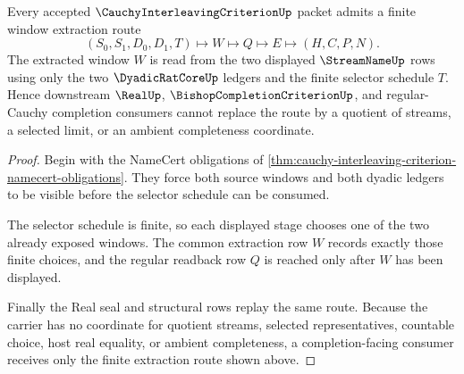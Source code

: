 \begin{theorem}
\label{thm:cauchy-interleaving-criterion-window-extraction}
Every accepted $\CauchyInterleavingCriterionUp$ packet admits a finite window extraction route
$$
(S_0,S_1,D_0,D_1,T)\longmapsto W\longmapsto Q\longmapsto E\longmapsto(H,C,P,N).
$$
The extracted window $W$ is read from the two displayed $\StreamNameUp$ rows using only the two $\DyadicRatCoreUp$ ledgers and the finite selector schedule $T$. Hence downstream $\RealUp$, $\BishopCompletionCriterionUp$, and regular-Cauchy completion consumers cannot replace the route by a quotient of streams, a selected limit, or an ambient completeness coordinate.
\end{theorem}
\begin{proof}
Begin with the NameCert obligations of \autoref{thm:cauchy-interleaving-criterion-namecert-obligations}. They force both source windows and both dyadic ledgers to be visible before the selector schedule can be consumed.

The selector schedule is finite, so each displayed stage chooses one of the two already exposed windows. The common extraction row $W$ records exactly those finite choices, and the regular readback row $Q$ is reached only after $W$ has been displayed.

Finally the Real seal and structural rows replay the same route. Because the carrier has no coordinate for quotient streams, selected representatives, countable choice, host real equality, or ambient completeness, a completion-facing consumer receives only the finite extraction route shown above.
\end{proof}


\begin{closurestatus}{\CauchyInterleavingCriterionUp}
  \theoryclosure{\seedClosure}
  \formalstatus{\theoremCheckedV}
\end{closurestatus}

